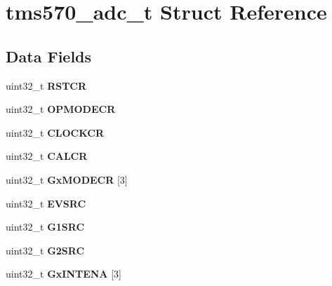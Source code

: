 \hypertarget{structtms570__adc__t}{}\section{tms570\+\_\+adc\+\_\+t Struct Reference}
\label{structtms570__adc__t}
\subsection*{Data Fields}
\begin{DoxyCompactItemize}
\item 
\mbox{\label{structtms570__adc__t_aa102ab9644d45887a74cf1aa2c359f58}} 
uint32\+\_\+t {\bfseries R\+S\+T\+CR}
\item 
\mbox{\label{structtms570__adc__t_a674e8c8d5c3e4244d111bb16679aaa50}} 
uint32\+\_\+t {\bfseries O\+P\+M\+O\+D\+E\+CR}
\item 
\mbox{\label{structtms570__adc__t_a4087e87ab82d4d04a892f9f02ded533f}} 
uint32\+\_\+t {\bfseries C\+L\+O\+C\+K\+CR}
\item 
\mbox{\label{structtms570__adc__t_a0ae4688e60fcd6a93f4fc9d362eb0743}} 
uint32\+\_\+t {\bfseries C\+A\+L\+CR}
\item 
\mbox{\label{structtms570__adc__t_a0872a73a25ddc0a70b6b3186f79b0634}} 
uint32\+\_\+t {\bfseries Gx\+M\+O\+D\+E\+CR} \mbox{[}3\mbox{]}
\item 
\mbox{\label{structtms570__adc__t_a52cf5c39cc4f60d0162d99d6b13fbbdd}} 
uint32\+\_\+t {\bfseries E\+V\+S\+RC}
\item 
\mbox{\label{structtms570__adc__t_a80ba2fd31c6806e00ac92cd528af3c7d}} 
uint32\+\_\+t {\bfseries G1\+S\+RC}
\item 
\mbox{\label{structtms570__adc__t_adacf9b8f0601b78301ab80f99d7c73c8}} 
uint32\+\_\+t {\bfseries G2\+S\+RC}
\item 
\mbox{\label{structtms570__adc__t_a867cd3613c074d4bf1ffa57dec2d1c14}} 
uint32\+\_\+t {\bfseries Gx\+I\+N\+T\+E\+NA} \mbox{[}3\mbox{]}

\end{DoxyCompactItemize}
